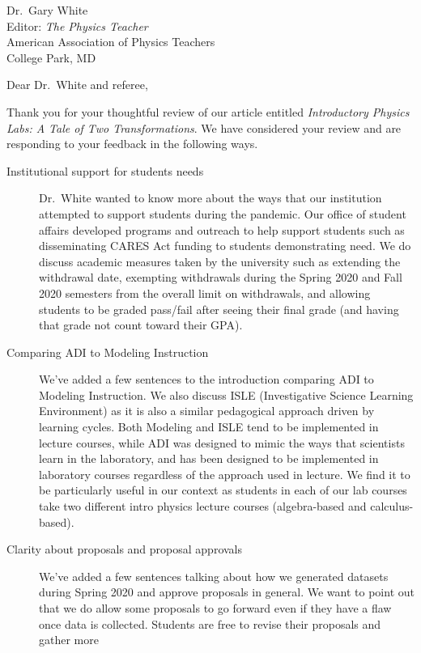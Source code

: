 \documentclass{letter}
\begin{document}
\begin{letter}{Dr.\ Gary White \\ Editor: \textit{The Physics Teacher} \\ American Association
    of Physics Teachers \\ College Park, MD}

  \opening{Dear Dr.\ White and referee,}

  Thank you for your thoughtful review of our article entitled \textit{Introductory Physics
    Labs: A Tale of Two Transformations}. We have considered your review and are responding to
  your feedback in the following ways.

  \begin{description}
    \item[Institutional support for students needs] Dr.\ White wanted to know more about the
    ways that our institution attempted to support students during the pandemic.  Our office of
    student affairs developed programs and outreach to help support students such as
    disseminating CARES Act funding to students demonstrating need.  We do discuss academic
    measures taken by the university such as extending the withdrawal date, exempting
    withdrawals during the Spring 2020 and Fall 2020 semesters from the overall limit on
    withdrawals, and allowing students to be graded pass/fail after seeing their final grade
    (and having that grade not count toward their GPA).
    \item[Comparing ADI to Modeling Instruction] We've added a few sentences to the
    introduction comparing ADI to Modeling Instruction.  We also discuss ISLE (Investigative
    Science Learning Environment) as it is also a similar pedagogical approach driven by
    learning cycles.  Both Modeling and ISLE tend to be implemented in lecture courses, while
    ADI was designed to mimic the ways that scientists learn in the laboratory, and has been
    designed to be implemented in laboratory courses regardless of the approach used in
    lecture. We find it to be particularly useful in our context as students in each of our lab
    courses take two different intro physics lecture courses (algebra-based and calculus-based).
    \item[Clarity about proposals and proposal approvals] We've added a few sentences talking
    about how we generated datasets during Spring 2020 and approve proposals in general. We
    want to point out that we do allow some proposals to go forward even if they have a flaw
    once data is collected.  Students are free to revise their proposals and gather more

\end{description}
\end{letter}
\end{document}
